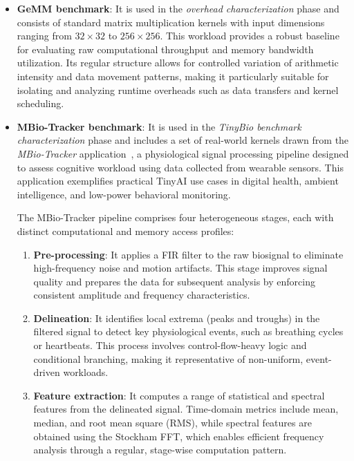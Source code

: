             \begin{itemize}
                \item \textbf{GeMM benchmark}: It is used in the \textit{overhead characterization} phase and consists of standard matrix multiplication kernels with input dimensions ranging from $32 \times 32$ to $256 \times 256$. This workload provides a robust baseline for evaluating raw computational throughput and memory bandwidth utilization. Its regular structure allows for controlled variation of arithmetic intensity and data movement patterns, making it particularly suitable for isolating and analyzing runtime overheads such as data transfers and kernel scheduling.
                
                \item \textbf{MBio-Tracker benchmark}: It is used in the \textit{TinyBio benchmark characterization} phase and includes a set of real-world kernels drawn from the \textit{MBio-Tracker} application~\cite{mbio_tracker}, a physiological signal processing pipeline designed to assess cognitive workload using data collected from wearable sensors. This application exemplifies practical TinyAI use cases in digital health, ambient intelligence, and low-power behavioral monitoring.

                The MBio-Tracker pipeline comprises four heterogeneous stages, each with distinct computational and memory access profiles:
        
                \begin{enumerate}[label=(\alph*)]
                    \item \textbf{Pre-processing}: It applies a FIR filter to the raw biosignal to eliminate high-frequency noise and motion artifacts. This stage improves signal quality and prepares the data for subsequent analysis by enforcing consistent amplitude and frequency characteristics.
                
                    \item \textbf{Delineation}: It identifies local extrema (peaks and troughs) in the filtered signal to detect key physiological events, such as breathing cycles or heartbeats. This process involves control-flow-heavy logic and conditional branching, making it representative of non-uniform, event-driven workloads.
                
                    \item \textbf{Feature extraction}: It computes a range of statistical and spectral features from the delineated signal. Time-domain metrics include mean, median, and root mean square (RMS), while spectral features are obtained using the Stockham FFT, which enables efficient frequency analysis through a regular, stage-wise computation pattern.
                

\end{enumerate}
\end{itemize}
